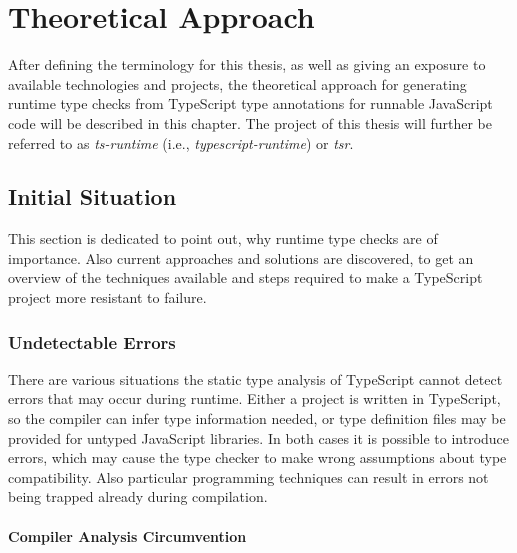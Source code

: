 \chapter{Theoretical Approach}
\label{cha:theoretical-approach}

After defining the terminology for this thesis, as well as giving an exposure to available technologies and projects, the theoretical approach for generating runtime type checks from TypeScript type annotations for runnable JavaScript code will be described in this chapter. The project of this thesis will further be referred to as \emph{ts-runtime} (i.e., \emph{typescript-runtime}) or \emph{tsr}.

\section{Initial Situation}
\label{sec:initial-situation}

This section is dedicated to point out, why runtime type checks are of importance. Also current approaches and solutions are discovered, to get an overview of the techniques available and steps required to make a TypeScript project more resistant to failure.

\subsection{Undetectable Errors}
\label{sec:undetectable-errors}

There are various situations the static type analysis of TypeScript cannot detect errors that may occur during runtime. Either a project is written in TypeScript, so the compiler can infer type information needed, or type definition files may be provided for untyped JavaScript libraries. In both cases it is possible to introduce errors, which may cause the type checker to make wrong assumptions about type compatibility. Also particular programming techniques can result in errors not being trapped already during compilation.

\subsubsection{Compiler Analysis Circumvention}

